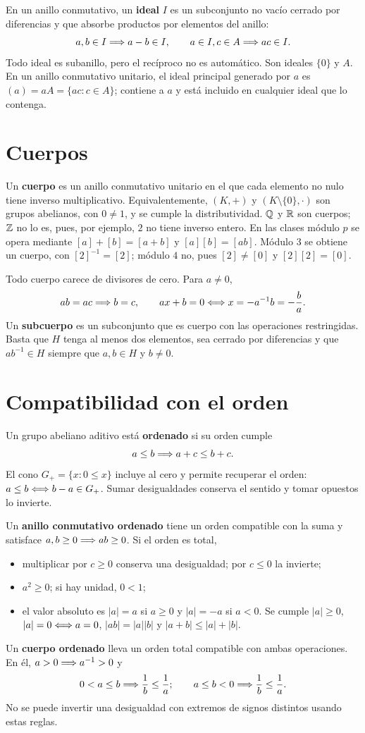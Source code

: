 En un anillo conmutativo, un \textbf{ideal} $I$ es un subconjunto no vacío
cerrado por diferencias y que absorbe productos por elementos del anillo:
\[
 a,b\in I\Longrightarrow a-b\in I,\qquad a\in I, c\in A\Longrightarrow ac\in I.
\]
Todo ideal es subanillo, pero el recíproco no es automático. Son ideales
$\{0\}$ y $A$. En un anillo conmutativo unitario, el ideal principal
generado por $a$ es $(a)=aA=\{ac:c\in A\}$; contiene a $a$ y está
incluido en cualquier ideal que lo contenga.

\section{Cuerpos}
\label{sec:cuerpos}
Un \textbf{cuerpo} es un anillo conmutativo unitario en el que cada
elemento no nulo tiene inverso multiplicativo. Equivalentemente,
$(K,+)$ y $(K\setminus\{0\},\cdot)$ son grupos abelianos, con $0\ne1$,
y se cumple la distributividad. $\mathbb{Q}$ y $\mathbb{R}$ son cuerpos; $\mathbb{Z}$ no lo es,
pues, por ejemplo, $2$ no tiene inverso entero.
En las clases módulo $p$ se opera mediante $[a]+[b]=[a+b]$ y
$[a][b]=[ab]$. Módulo $3$ se obtiene un cuerpo, con $[2]^{-1}=[2]$;
módulo $4$ no, pues $[2]\ne[0]$ y $[2][2]=[0]$.

Todo cuerpo carece de divisores de cero. Para $a\ne0$,
\[
 ab=ac\Longrightarrow b=c,\qquad ax+b=0\Longleftrightarrow x=-a^{-1}b=-\frac ba.
\]
Un \textbf{subcuerpo} es un subconjunto que es cuerpo con las operaciones
restringidas. Basta que $H$ tenga al menos dos elementos, sea cerrado
por diferencias y que $ab^{-1}\in H$ siempre que $a,b\in H$ y $b\ne0$.

\section{Compatibilidad con el orden}
\label{sec:estructuras-ordenadas}
Un grupo abeliano aditivo está \textbf{ordenado} si su orden cumple
\[
 a\le b\Longrightarrow a+c\le b+c.
\]
El cono $G_+=\{x:0\le x\}$ incluye al cero y permite recuperar el orden:
$a\le b\Longleftrightarrow b-a\in G_+$. Sumar desigualdades conserva el sentido y
tomar opuestos lo invierte.

Un \textbf{anillo conmutativo ordenado} tiene un orden compatible con la
suma y satisface $a,b\ge0\Longrightarrow ab\ge0$. Si el orden es total,
\begin{itemize}
\item multiplicar por $c\ge0$ conserva una desigualdad; por $c\le0$ la invierte;
\item $a^2\ge0$; si hay unidad, $0<1$;
\item el valor absoluto es $|a|=a$ si $a\ge0$ y $|a|=-a$ si $a<0$.
Se cumple $|a|\ge0$, $|a|=0\Longleftrightarrow a=0$, $|ab|=|a||b|$ y
$|a+b|\le|a|+|b|$.
\end{itemize}
Un \textbf{cuerpo ordenado} lleva un orden total compatible con ambas
operaciones. En él, $a>0\Longrightarrow a^{-1}>0$ y
\[
 0<a\le b\Longrightarrow \frac1b\le\frac1a;
 \qquad a\le b<0\Longrightarrow \frac1b\le\frac1a.
\]
No se puede invertir una desigualdad con extremos de signos distintos
usando estas reglas.

